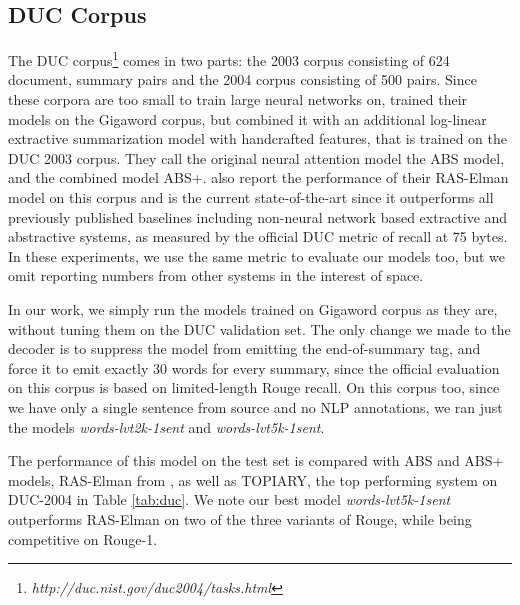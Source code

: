 \documentclass[11pt]{article}
\begin{document}
\subsection{DUC Corpus}

The DUC corpus\footnote{{\it http://duc.nist.gov/duc2004/tasks.html}} comes in two parts: the 2003 corpus consisting of 624 document, summary pairs and the 2004 corpus consisting of 500 pairs. Since these corpora are too small to train large neural networks on,  trained their models on the Gigaword corpus, but combined it with an additional log-linear extractive summarization model with handcrafted features, that is trained on the DUC 2003 corpus. They call the original neural attention model the ABS model, and the combined model ABS+.  also report the performance of their RAS-Elman model on this corpus and is the current state-of-the-art since it outperforms all previously published baselines including non-neural network based extractive and abstractive systems, as measured by the official DUC metric of recall at 75 bytes. In these experiments, we use the same metric to evaluate our models too, but we omit reporting numbers from other systems in the interest of space.

In our work, we simply run the models trained on Gigaword corpus as they are, without tuning them on the DUC validation set. The only change we made to the decoder is to suppress the model from emitting the end-of-summary tag, and force it to emit exactly 30 words for every summary, since the official evaluation on this corpus is based on limited-length Rouge recall. On this corpus too, since we have only a single sentence from source and no NLP annotations, we ran just the models {\it words-lvt2k-1sent} and {\it words-lvt5k-1sent}.

The performance of this model on the test set is compared with ABS and ABS+ models, RAS-Elman from \cite{chopra}, as well as TOPIARY, the top performing system on DUC-2004 in Table \ref{tab:duc}. We note our best model {\it words-lvt5k-1sent} outperforms RAS-Elman on two of the three variants of Rouge, while being competitive on Rouge-1.
\end{document}
